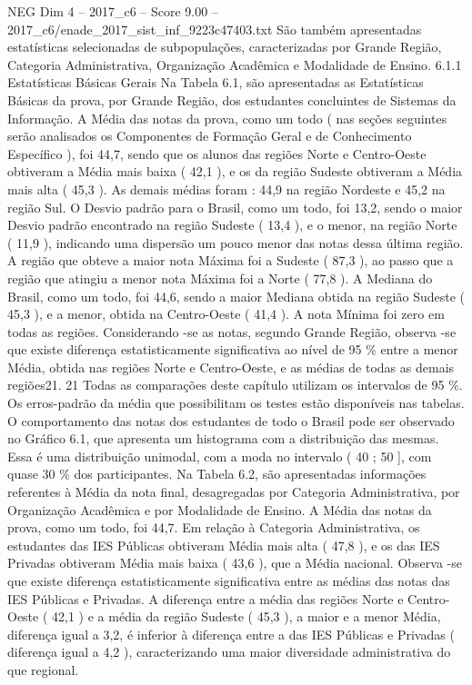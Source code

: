 \begin{textsample}{NEG Dim 4 – 2017\_c6 – Score 9.00 – 2017\_c6/enade\_2017\_sist\_inf\_9223c47403.txt}
São também apresentadas estatísticas selecionadas de subpopulações, caracterizadas por Grande Região, Categoria Administrativa, Organização Acadêmica e Modalidade de Ensino. 6.1.1 Estatísticas Básicas Gerais Na Tabela 6.1, são apresentadas as Estatísticas Básicas da prova, por Grande Região, dos estudantes concluintes de Sistemas da Informação.
A Média das notas da prova, como um todo ( nas seções seguintes serão analisados os Componentes de Formação Geral e de Conhecimento Específico ), foi 44,7, sendo que os alunos das regiões Norte e Centro-Oeste obtiveram a Média mais baixa ( 42,1 ), e os da região Sudeste obtiveram a Média mais alta ( 45,3 ).
As demais médias foram : 44,9 na região Nordeste e 45,2 na região Sul.
O Desvio padrão para o Brasil, como um todo, foi 13,2, sendo o maior Desvio padrão encontrado na região Sudeste ( 13,4 ), e o menor, na região Norte ( 11,9 ), indicando uma dispersão um pouco menor das notas dessa última região.
A região que obteve a maior nota Máxima foi a Sudeste ( 87,3 ), ao passo que a região que atingiu a menor nota Máxima foi a Norte ( 77,8 ).
A Mediana do Brasil, como um todo, foi 44,6, sendo a maior Mediana obtida na região Sudeste ( 45,3 ), e a menor, obtida na Centro-Oeste ( 41,4 ).
A nota Mínima foi zero em todas as regiões.
Considerando -se as notas, segundo Grande Região, observa -se que existe diferença estatisticamente significativa ao nível de 95 \% entre a menor Média, obtida nas regiões Norte e Centro-Oeste, e as médias de todas as demais regiões21. 21 Todas as comparações deste capítulo utilizam os intervalos de 95 \%.
Os erros-padrão da média que possibilitam os testes estão disponíveis nas tabelas.
O comportamento das notas dos estudantes de todo o Brasil pode ser observado no Gráfico 6.1, que apresenta um histograma com a distribuição das mesmas.
Essa é uma distribuição unimodal, com a moda no intervalo ( 40 ; 50 ], com quase 30 \% dos participantes.
Na Tabela 6.2, são apresentadas informações referentes à Média da nota final, desagregadas por Categoria Administrativa, por Organização Acadêmica e por Modalidade de Ensino.
A Média das notas da prova, como um todo, foi 44,7.
Em relação à Categoria Administrativa, os estudantes das IES Públicas obtiveram Média mais alta ( 47,8 ), e os das IES Privadas obtiveram Média mais baixa ( 43,6 ), que a Média nacional.
Observa -se que existe diferença estatisticamente significativa entre as médias das notas das IES Públicas e Privadas.
A diferença entre a média das regiões Norte e Centro-Oeste ( 42,1 ) e a média da região Sudeste ( 45,3 ), a maior e a menor Média, diferença igual a 3,2, é inferior à diferença entre a das IES Públicas e Privadas ( diferença igual a 4,2 ), caracterizando uma maior diversidade administrativa do que regional.

\end{textsample}
